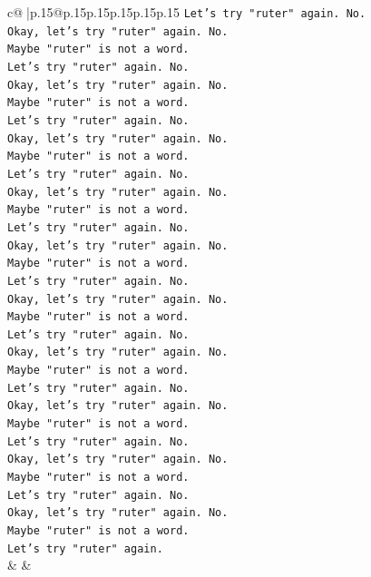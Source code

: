 \documentclass{article}
\begin{document}
{\begin{supertabular}{c@{$\;$}|p{.15\linewidth}@{}p{.15\linewidth}p{.15\linewidth}p{.15\linewidth}p{.15\linewidth}p{.15\linewidth}}
{{{\texttt{Let's try "ruter" again. No.} \\
\texttt{Okay, let's try "ruter" again. No.} \\
\texttt{Maybe "ruter" is not a word.} \\
\texttt{Let's try "ruter" again. No.} \\
\texttt{Okay, let's try "ruter" again. No.} \\
\texttt{Maybe "ruter" is not a word.} \\
\texttt{Let's try "ruter" again. No.} \\
\texttt{Okay, let's try "ruter" again. No.} \\
\texttt{Maybe "ruter" is not a word.} \\
\texttt{Let's try "ruter" again. No.} \\
\texttt{Okay, let's try "ruter" again. No.} \\
\texttt{Maybe "ruter" is not a word.} \\
\texttt{Let's try "ruter" again. No.} \\
\texttt{Okay, let's try "ruter" again. No.} \\
\texttt{Maybe "ruter" is not a word.} \\
\texttt{Let's try "ruter" again. No.} \\
\texttt{Okay, let's try "ruter" again. No.} \\
\texttt{Maybe "ruter" is not a word.} \\
\texttt{Let's try "ruter" again. No.} \\
\texttt{Okay, let's try "ruter" again. No.} \\
\texttt{Maybe "ruter" is not a word.} \\
\texttt{Let's try "ruter" again. No.} \\
\texttt{Okay, let's try "ruter" again. No.} \\
\texttt{Maybe "ruter" is not a word.} \\
\texttt{Let's try "ruter" again. No.} \\
\texttt{Okay, let's try "ruter" again. No.} \\
\texttt{Maybe "ruter" is not a word.} \\
\texttt{Let's try "ruter" again. No.} \\
\texttt{Okay, let's try "ruter" again. No.} \\
\texttt{Maybe "ruter" is not a word.} \\
\texttt{Let's try "ruter" again.} \\
            }
        }
    }
    & & \\ \\


\end{supertabular}}
\end{document}
